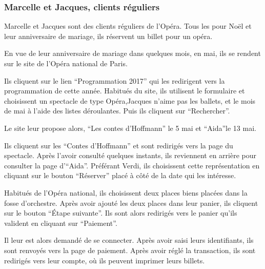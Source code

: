 \subsubsection{Marcelle et Jacques, clients
réguliers}\label{marcelle-et-jacques-clients-ruxe9guliers}

Marcelle et Jacques sont des clients réguliers de l'Opéra. Tous les pour
Noël et leur anniversaire de mariage, ils réservent un billet pour un
opéra.

En vue de leur anniversaire de mariage dans quelques mois, en mai, ils
se rendent sur le site de l'Opéra national de Paris.

Ils cliquent sur le lien ``Programmation 2017'' qui les redirigent vers
la programmation de cette année. Habitués du site, ils utilisent le
formulaire et choisissent un spectacle de type Opéra,Jacques n'aime pas
les ballets, et le mois de mai à l'aide des listes déroulantes. Puis ils
cliquent sur ``Rechercher''.

Le site leur propose alors, ``Les contes d'Hoffmann'' le 5 mai et
``Aida''le 13 mai.

Ils cliquent sur les ``Contes d'Hoffmann'' et sont redirigés vers la
page du spectacle. Après l'avoir consulté quelques instants, ils
reviennent en arrière pour consulter la page d'``Aida''. Préférant
Verdi, ils choisissent cette représentation en cliquant sur le bouton
``Réserver'' placé à côté de la date qui les intéresse.

Habitués de l'Opéra national, ils choisissent deux places biens placées
dans la fosse d'orchestre. Après avoir ajouté les deux places dans leur
panier, ils cliquent sur le bouton ``Étape suivante''. Ils sont alors
redirigés vers le panier qu'ils valident en cliquant sur ``Paiement''.

Il leur est alors demandé de se connecter. Après avoir saisi leurs
identifiants, ils sont renvoyés vers la page de paiement. Après avoir
réglé la transaction, ils sont redirigés vers leur compte, où ils
peuvent imprimer leurs billets.
